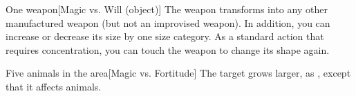 \spelldur{\durmed}
\begin{spelltarget}{One weapon}[Magic vs. Will (object)]
    \spellsuccess The weapon transforms into any other manufactured weapon (but not an improvised weapon). In addition, you can increase or decrease its size by one size category.
    \spelleffect As a standard action that requires concentration, you can touch the weapon to change its shape again.
\end{spelltarget}

\begin{spelltarget}{Five animals in the area}[Magic vs. Fortitude]
    \spellsuccess The target grows larger, as , except that it affects animals.
\end{spelltarget}

\begin{comment}
\spellsection{Animate Objects}{5}
\spelldesc{You imbue inanimate objects with mobility and a semblance of life.}
\spellinfo{Trans (Animation)}{Chaos, Trans}
\spelltwocol{\spelllimit{\areamed radius}}{\spellrng{\rngmed}}
\spelltgts{One Small object/level in the area; see text}
\spelldur{\durshort}
\spelleffect Each animated object immediately attacks whomever or whatever you initially designate. Your control of the objects is limited to simple commands (``Attack,'' ``Defend,'' ``Stop,'' and so forth).
\par An animated object can be of any nonmagical material. You may animate one Small or smaller object or an equivalent number of larger objects per caster level. A Medium object counts as two Small or smaller objects, a Large object as four, a Huge object as eight, a Gargantuan object as sixteen, and a Colossal object as thirty-two. You can give the objects new commands as a move action, as normal for directing an active spell.
\spellnotes This spell cannot animate objects carried or worn by a creature. This spell can be made permanent with a \spell{permanency} ritual.

\spellsection{Animate Plants}{5}
\spelldesc{You imbue inanimate plants with mobility and a semblance of life.}
\spellinfo{Trans (Animation)}{Nature, Plant}
\begin{spelltargets}{One Small plant/level in the area; see text}
    \spelleffect This spell functions like \spell{animate objects}, except that you animate plants instead of inanimate objects.
\end{spelltargets}
\spellnotes \spell{Animate plants} cannot affect plant creatures, nor does it affect nonliving vegetable material.
\end{comment}

